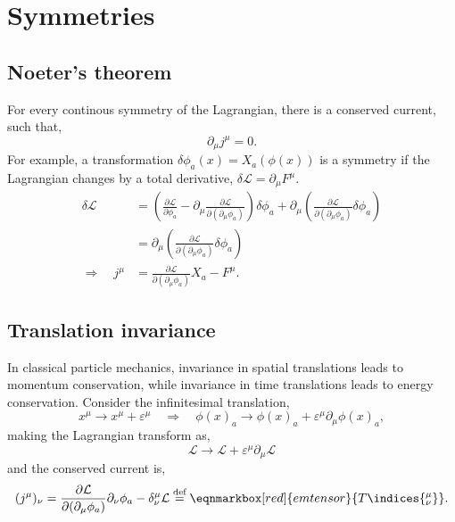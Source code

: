 \section{Symmetries}
\subsection{Noeter's theorem}
For every continous symmetry of the Lagrangian, there is a conserved current, such that, 
\begin{equation}
  \partial_\mu j^\mu = 0. 
\end{equation}
For example, a transformation $\delta\phi_a(x) = X_a(\phi(x))$ is a symmetry if the Lagrangian changes by a total derivative, $\delta\mathcal{L} = \partial_\mu F^\mu$.\begin{equation}
  \begin{align}
    \delta\mathcal{L} &= \left(\frac{\partial\mathcal{L}}{\partial\phi_a}-\partial_\mu\frac{\partial\mathcal{L}}{\partial(\partial_\mu\phi_a)}\right)\delta\phi_a + \partial_\mu\left(\frac{\partial\mathcal{L}}{\partial(\partial_\mu\phi_a)}\delta\phi_a\right)\\
    &= \partial_\mu\left(\frac{\partial\mathcal{L}}{\partial(\partial_\mu\phi_a)}\delta\phi_a\right)\\
    \Rightarrow \quad j^\mu &= \frac{\partial\mathcal{L}}{\partial(\partial_\mu\phi_a)}X_a - F^\mu.
  \end{align}
\end{equation}
\subsection{Translation invariance}
In classical particle mechanics, invariance in spatial translations leads to momentum conservation, while invariance in time translations leads to energy conservation. Consider the infinitesimal translation, 
\begin{equation}
  x^\mu \rightarrow x^\mu + \varepsilon^\mu \quad \Rightarrow \quad \phi(x)_a \rightarrow \phi(x)_a + \varepsilon^\mu\partial_\mu\phi(x)_a,
\end{equation}
making the Lagrangian transform as, 
\begin{equation}
  \mathcal{L} \rightarrow \mathcal{L} + \varepsilon^\mu\partial_\mu\mathcal{L}
\end{equation}
and the conserved current is,
\begin{equation}
  (j^\mu)_\nu = \frac{\partial\mathcal{L}}{\partial(\partial_\mu\phi_a)}\partial_\nu\phi_a - \delta^\mu_\nu\mathcal{L} \overset{\text{def}}{=} \eqnmarkbox[red]{emtensor}{T\indices{^\mu_\nu}}.
\end{equation}
\\

